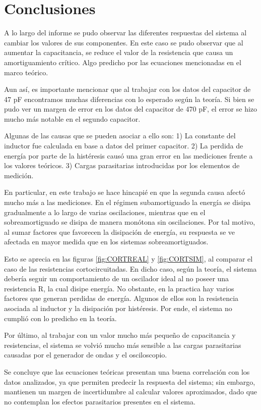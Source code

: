 \documentclass{article}
\begin{document}
\section{Conclusiones}
	A lo largo del informe se pudo observar las diferentes respuestas del sistema al cambiar los valores de sus componentes. En este caso se pudo observar que al aumentar la capacitancia, se reduce el valor de la resistencia que causa un amortiguamiento crítico. Algo predicho por las ecuaciones mencionadas en el marco teórico.\par
	Aun así, es importante mencionar que al trabajar con los datos del capacitor de 47 pF encontramos muchas diferencias con lo esperado según la teoría. Si bien se pudo ver un margen de error en los datos del capacitor de 470 pF, el error se hizo mucho más notable en el segundo capacitor.\par
	Algunas de las causas que se pueden asociar a ello son: 1) La constante del inductor fue calculada en base a datos del primer capacitor. 2) La perdida de energía por parte de la histéresis causó una gran error en las mediciones frente a los valores teóricos. 3) Cargas parasitarias introducidas por los elementos de medición.\par
	En particular, en este trabajo se hace hincapié en que la segunda causa afectó mucho más a las mediciones. En el régimen subamortiguado la energía se disipa gradualmente a lo largo de varias oscilaciones, mientras que en el sobreamortiguado se disipa de manera monótona sin oscilaciones. Por tal motivo, al sumar factores que favorecen la disipación de energía, su respuesta se ve afectada en mayor medida que en los sistemas sobreamortiguados. \par
	 Esto se aprecia en las figuras \ref{fig:CORTREAL} y \ref{fig:CORTSIM}, al comparar el caso de las resistencias cortocircuitadas. En dicho caso, según la teoría, el sistema debería seguir un comportamiento de un oscilador ideal al no poseer una resistencia R, la cual disipe energía. No obstante, en la practica hay varios factores que generan perdidas de energía. Algunos de ellos son la resistencia asociada al inductor y la disipación por histéresis. Por ende, el sistema no cumplió con lo predicho en la teoría.\par
	 Por último, al trabajar con un valor mucho más pequeño de capacitancia y resistencias, el sistema se volvió mucho más sensible a las cargas parasitarias causadas por el generador de ondas y el osciloscopio.\par
	Se concluye que las ecuaciones teóricas presentan una buena correlación con los datos analizados, ya que permiten predecir la respuesta del sistema; sin embargo, mantienen un margen de incertidumbre al calcular valores aproximados, dado que no contemplan los efectos parasitarios presentes en el sistema.	
	
\end{document}
